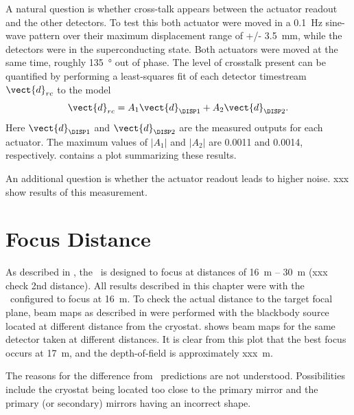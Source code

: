 A natural question is whether cross-talk appears between the actuator readout and the other detectors.
To test this both actuator were moved in a 0.1~Hz sine-wave pattern over their maximum displacement range of +/- 3.5~mm, while the detectors were in the superconducting state.
Both actuators were moved at the same time, roughly \SI{135}{\degree} out of phase.
The level of crosstalk present can be quantified by performing a least-squares fit of each detector timestream $\vect{d}_{rc}$ to the model
\begin{equation}
	 \vect{d}_{rc} = A_1 \vect{d}_{\DISP1} + A_2 \vect{d}_{\DISP2}.
\end{equation}
Here $\vect{d}_{\DISP1}$ and $\vect{d}_{\DISP2}$ are the measured outputs for each actuator.
The maximum values of $|A_1|$  and $|A_2|$ are 0.0011 and 0.0014, respectively.
 contains a plot summarizing these results.

An additional question is whether the actuator readout leads to higher noise.
xxx show results of this measurement.


\section{Focus Distance}\label{s:focus-distance}

As described in , the \Imager\ is designed to focus at distances of 16~m -- 30~m (xxx check 2nd distance).
All results described in this chapter were with the \Imager\ configured to focus at 16~m.
To check the actual distance to the target focal plane, beam maps as described in  were performed with the blackbody source located at different distance from the cryostat.
 shows beam maps for the same detector taken at different distances.
It is clear from this plot that the best focus occurs at \abt \SI{17}{m}, and the depth-of-field is approximately xxx~m.

The reasons for the difference from \ZEMAX\ predictions are not understood.
Possibilities include the cryostat being located too close to the primary mirror and the primary (or secondary) mirrors having an incorrect shape.

